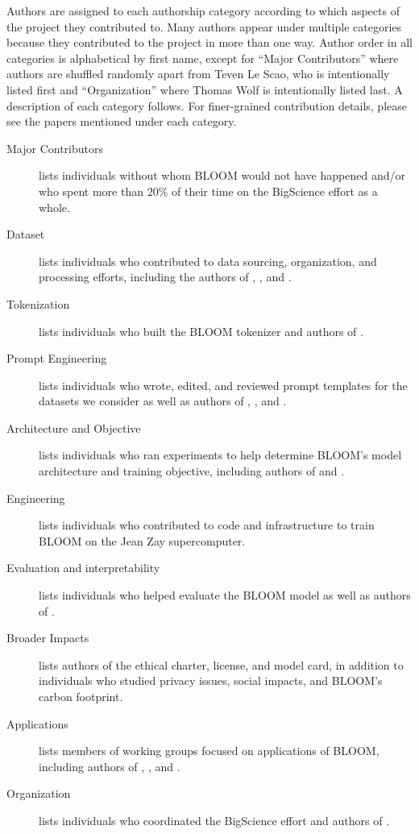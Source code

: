 \documentclass[twoside,11pt]{article}
\begin{document}
Authors are assigned to each authorship category according to which aspects of the project they contributed to.
Many authors appear under multiple categories because they contributed to the project in more than one way.
Author order in all categories is alphabetical by first name, except for ``Major Contributors'' where authors are shuffled randomly apart from Teven Le Scao, who is intentionally listed first and ``Organization'' where Thomas Wolf is intentionally listed last.
A description of each category follows.
For finer-grained contribution details, please see the papers mentioned under each category.
\begin{description}
\item[Major Contributors] lists individuals without whom BLOOM would not have happened and/or who spent more than 20\% of their time on the BigScience effort as a whole.
\item[Dataset] lists individuals who contributed to data sourcing, organization, and processing efforts, including the authors of \citet{laurencon2022bigscience}, \citet{mcmillan-major2022documenting}, and \citet{jernite2022data}.
\item[Tokenization] lists individuals who built the BLOOM tokenizer and authors of \citet{mielke2021between}.
\item[Prompt Engineering] lists individuals who wrote, edited, and reviewed prompt templates for the datasets we consider as well as authors of \citet{sanh2022multitask}, \citet{bach2022promptsource}, and \citet{muennighoff2022crosslingual}.
\item[Architecture and Objective] lists individuals who ran experiments to help determine BLOOM's model architecture and training objective, including authors of \citet{wang2022what} and \citet{scao2022what}.
\item[Engineering] lists individuals who contributed to code and infrastructure to  train BLOOM on the Jean Zay supercomputer.
\item[Evaluation and interpretability] lists individuals who helped evaluate the BLOOM model as well as authors of \citet{talat2022you}.
\item[Broader Impacts] lists authors of the ethical charter, license, and model card, in addition to individuals who studied privacy issues, social impacts, and BLOOM's carbon footprint.
\item[Applications] lists members of working groups focused on applications of BLOOM, including authors of \citet{bigbio}, \citet{fries2022dataset}, and \citet{de-toni-etal-2022-entities}.
\item[Organization] lists individuals who coordinated the BigScience effort and authors of \citet{bigscience2022org}.
\end{description}
\end{document}
